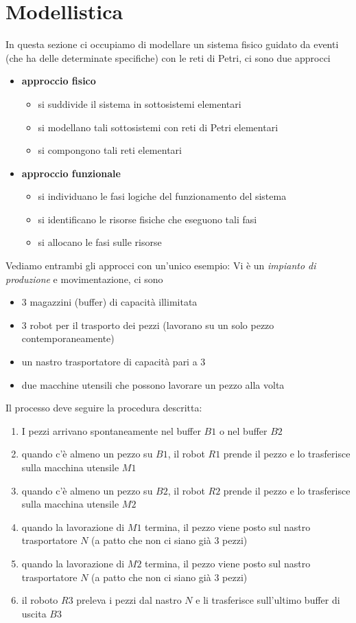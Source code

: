 \documentclass[10pt, letterpaper]{report}
\begin{document}
\section{Modellistica}
In questa sezione ci occupiamo di modellare un sistema fisico guidato da eventi (che ha delle determinate specifiche) con le reti di Petri, ci sono due approcci
\begin{itemize}
    \item \textbf{approccio fisico}\begin{itemize}
        \item 
     si suddivide il sistema in sottosistemi elementari
     \item  si modellano tali sottosistemi con reti di Petri elementari
     \item  si compongono tali reti elementari   \end{itemize}
     \item \textbf{approccio funzionale}\begin{itemize}
        \item si individuano le fasi logiche del funzionamento del sistema
        \item si identificano le risorse fisiche che eseguono tali fasi
        \item si allocano le fasi sulle risorse \end{itemize}
\end{itemize}
Vediamo entrambi gli approcci con un'unico esempio: Vi è un \textit{impianto di produzione} e movimentazione, ci sono\begin{itemize}
    \item 3 magazzini (buffer) di capacità illimitata 
    \item 3 robot per il trasporto dei pezzi (lavorano su un solo pezzo contemporaneamente)
    \item un nastro trasportatore di capacità pari a 3 
    \item due macchine utensili che possono lavorare un pezzo alla volta 
\end{itemize}
Il processo deve seguire la procedura descritta:\begin{enumerate}
    \item I pezzi arrivano spontaneamente nel buffer $B1$ o nel buffer $B2$
    \item quando c'è almeno un pezzo su $B1$, il robot $R1$ prende il pezzo e lo trasferisce sulla macchina utensile $M1$
    \item quando c'è almeno un pezzo su $B2$, il robot $R2$ prende il pezzo e lo trasferisce sulla macchina utensile $M2$
    \item quando la lavorazione di $M1$ termina, il pezzo viene posto sul nastro trasportatore $N$ (a patto che non ci siano già 3 pezzi)
    \item quando la lavorazione di $M2$ termina, il pezzo viene posto sul nastro trasportatore $N$ (a patto che non ci siano già 3 pezzi)
    \item il roboto $R3$ preleva i pezzi dal nastro $N$ e li trasferisce sull'ultimo buffer di uscita $B3$
\end{enumerate}
\end{document}
